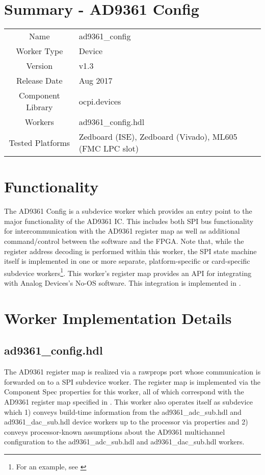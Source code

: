 \documentclass{article}
\author{} %
\date{Version \docVersion} %
\title{\docTitle}
\def\docVersion{1.3}
\def\comp{ad9361\_config}
\def\Comp{AD9361 Config}
\begin{document}
\section*{Summary - \Comp}
\begin{tabular}{|c|M{13.5cm}|}
  \hline
                    &                  \\
  \hline
  Name              & \comp            \\
  \hline
  Worker Type       & Device           \\
  \hline
  Version           & v\docVersion{}   \\
  \hline
  Release Date      & Aug 2017         \\
  \hline
  Component Library & ocpi.devices     \\
  \hline
  Workers           & \comp.hdl        \\
  \hline
  Tested Platforms  & Zedboard (ISE), Zedboard (Vivado), ML605 (FMC LPC slot) \\
  \hline
\end{tabular}

\section*{Functionality}
  The \Comp{} is a subdevice worker which provides an entry point to the major functionality of the AD9361 IC\cite{ad9361}. This includes both SPI bus functionality for intercommunication with the AD9361 register map as well as additional command/control between the software and the FPGA. Note that, while the register address decoding is performed within this worker, the SPI state machine itself is implemented in one or more separate, platform-specific or card-specific subdevice workers\footnote{For an example, see \cite{spi_comp_datasheet}}. This worker's register map provides an API for integrating with Analog Devices's No-OS software\cite{no_os}. This integration is implemented in \cite{config_proxy_comp_datasheet}.

\section*{Worker Implementation Details}
\subsection*{\comp.hdl}
The AD9361 register map is realized via a rawprops port whose communication is forwarded on to a SPI subdevice worker. The register map is implemented via the Component Spec properties for this worker, all of which correspond with the AD9361 register map specified in \cite{adi_ug671}. This worker also operates itself as subdevice which 1) conveys build-time information from the ad9361\_adc\_sub.hdl and ad9361\_dac\_sub.hdl device workers up to the processor via properties and 2) conveys processor-known assumptions about the AD9361 multichannel configuration to the ad9361\_adc\_sub.hdl and ad9361\_dac\_sub.hdl workers.
\end{document}
